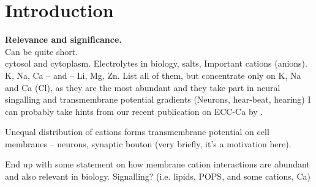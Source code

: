 \chapter*{Introduction}

 \textbf{Relevance and significance.} \\
 Can be quite short. \\
 cytosol and cytoplasm. Electrolytes in biology, salts, Important cations (anions). 
 K, Na, Ca -- and -- Li, Mg, Zn.
 List all of them, but concentrate only on K, Na and Ca (Cl), as they are the most abundant and they take part in neural singalling and transmembrane potential gradients (Neurons, hear-beat, hearing)
 I can probably take hints from our recent publication on ECC-Ca by \citet{martinek17}. 

 Unequal distribution of cations forms transmembrane potential on cell membranes -- neurons, synaptic bouton (very briefly, it's a motivation here). 

 End up with some statement on how membrane cation interactions are abundant and also relevant in biology.
 Signalling? (i.e. lipids, POPS, and some cations, Ca)

